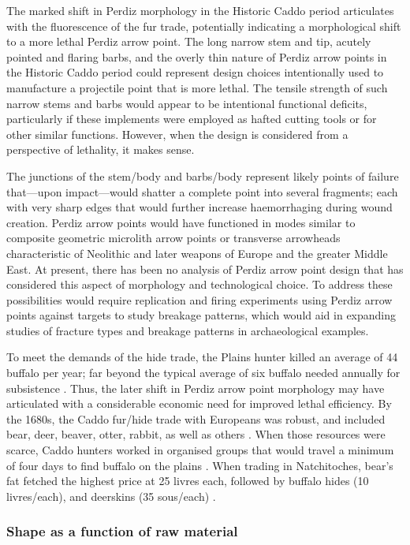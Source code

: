 \documentclass[review]{elsarticle}
\begin{document}
The marked shift in Perdiz morphology in the Historic Caddo period articulates with the fluorescence of the fur trade, potentially indicating a morphological shift to a more lethal Perdiz arrow point. The long narrow stem and tip, acutely pointed and flaring barbs, and the overly thin nature of Perdiz arrow points in the Historic Caddo period could represent design choices intentionally used to manufacture a projectile point that is more lethal. The tensile strength of such narrow stems and barbs would appear to be intentional functional deficits, particularly if these implements were employed as hafted cutting tools or for other similar functions. However, when the design is considered from a perspective of lethality, it makes sense.

The junctions of the stem/body and barbs/body represent likely points of failure that---upon impact---would shatter a complete point into several fragments; each with very sharp edges that would further increase haemorrhaging during wound creation. Perdiz arrow points would have functioned in modes similar to composite geometric microlith arrow points or transverse arrowheads characteristic of Neolithic and later weapons of Europe and the greater Middle East. At present, there has been no analysis of Perdiz arrow point design that has considered this aspect of morphology and technological choice. To address these possibilities would require replication and firing experiments using Perdiz arrow points against targets to study breakage patterns, which would aid in expanding studies of fracture types and breakage patterns in archaeological examples.

To meet the demands of the hide trade, the Plains hunter killed an average of 44 buffalo per year; far beyond the typical average of six buffalo needed annually for subsistence \citep{RN39}. Thus, the later shift in Perdiz arrow point morphology may have articulated with a considerable economic need for improved lethal efficiency. By the 1680s, the Caddo fur/hide trade with Europeans was robust, and included bear, deer, beaver, otter, rabbit, as well as others \citep{RN9005,RN39,RN8076}. When those resources were scarce, Caddo hunters worked in organised groups that would travel a minimum of four days to find buffalo on the plains \citep{RN9005,RN38}. When trading in Natchitoches, bear's fat fetched the highest price at 25 livres each, followed by buffalo hides (10 livres/each), and deerskins (35 sous/each) \citep{RN9005}.

\subsubsection*{Shape as a function of raw material}
\end{document}
